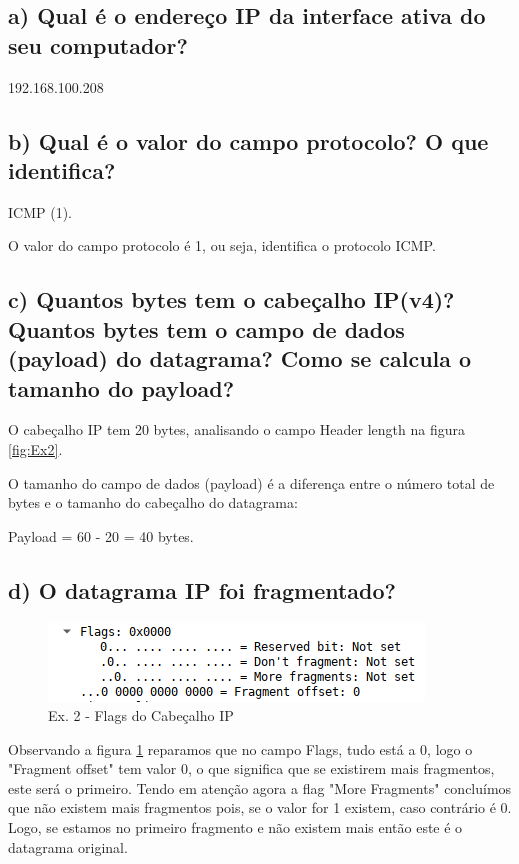 \documentclass[a4paper]{report}
\begin{document}
\subsection{a) Qual é o endereço IP da interface ativa do seu computador?}

192.168.100.208

\subsection{b) Qual é o valor do campo protocolo? O que identifica?}
ICMP (1).

O valor do campo protocolo é 1, ou seja, identifica o protocolo ICMP.

\subsection{c) Quantos bytes tem o cabeçalho IP(v4)? Quantos bytes tem o
campo de dados (payload) do datagrama? Como se calcula o tamanho 
do payload?}

O cabeçalho IP tem 20 bytes, analisando o campo Header length na 
figura \ref{fig:Ex2}.

O tamanho do campo de dados (payload) é a diferença entre o número 
total de bytes e o tamanho do cabeçalho do datagrama:

Payload = 60 - 20 = 40 bytes.

\subsection{d) O datagrama IP foi fragmentado? }

\begin{figure}[H]
    \centering 
    \includegraphics[width=\textwidth]{images/ipEx2Flags.png}
    \caption{Ex. 2 - Flags do Cabeçalho IP}
    \label{fig:ipEx2Flags}
\end{figure}


Observando a figura \ref{fig:ipEx2Flags} reparamos que no 
campo Flags, tudo está a 0, logo o "Fragment offset" tem valor 0, o que significa
que se existirem mais fragmentos, este será o primeiro. 
Tendo em atenção agora a flag "More Fragments" concluímos que não existem
mais fragmentos pois, se o valor for 1 existem, caso contrário é 0. Logo,
se estamos no primeiro fragmento e não existem mais então este é o datagrama
original.
\end{document}
